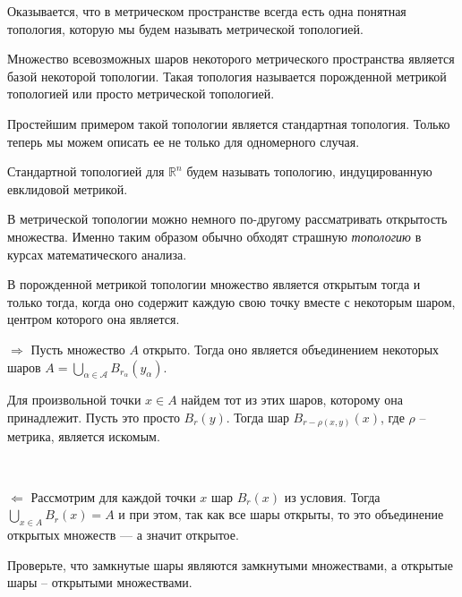    Оказывается, что в метрическом пространстве всегда есть одна понятная топология, которую мы будем называть метрической топологией.

   \begin{Def}
       Множество всевозможных шаров некоторого метрического пространства является базой некоторой топологии. Такая топология называется порожденной метрикой топологией или просто метрической топологией.
   \end{Def}
   \begin{Ex}
       Простейшим примером такой топологии является стандартная топология. Только теперь мы можем описать ее не только для одномерного случая.

       Стандартной топологией для $\mathbb{R}^n$ будем называть топологию, индуцированную евклидовой метрикой.
   \end{Ex}

    В метрической топологии можно немного по-другому рассматривать открытость множества. Именно таким образом обычно обходят страшную \textit{топологию} в курсах математического анализа.

   \begin{Prop}
       В порожденной метрикой топологии множество является открытым тогда и только тогда, когда оно содержит каждую свою точку вместе с некоторым шаром, центром которого она является.
   \end{Prop}
   \begin{Proof}
       $\Rightarrow$ Пусть множество $A$ открыто. Тогда оно является объединением некоторых шаров  $A = \bigcup\limits_{\alpha\in\mathcal{A}}B_{r_\alpha}(y_\alpha)$.   

       Для произвольной точки $x \in A$ найдем тот из этих шаров, которому она принадлежит. Пусть это просто $B_r(y)$. Тогда шар $B_{r-\rho(x,y)} (x)$, где $\rho$ -- метрика, является искомым.

       \

       \noindent$\Leftarrow$ Рассмотрим для каждой точки $x$ шар $B_r(x)$ из условия. Тогда $\bigcup\limits_{x\in A} B_r(x) = A$ и при этом, так как все шары открыты, то это объединение открытых множеств --- а значит открытое.
   \end{Proof}

   \begin{Task}
       Проверьте, что замкнутые шары являются замкнутыми множествами, а открытые шары -- открытыми множествами.
   \end{Task}

